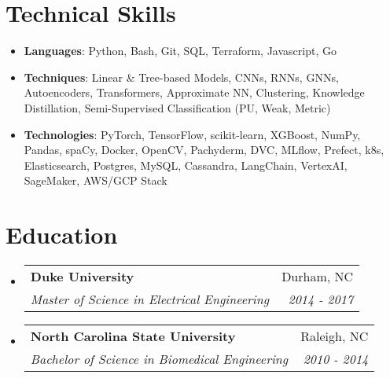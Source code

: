 \documentclass[letterpaper,11pt]{article}
\makeatletter
\newcommand{\skillsItem}[2]{
  \item\small{
    \textbf{#1}{: #2}
  }
}
\newcommand{\resumeSubheading}[4]{
  \vspace{-1pt}\item
    \begin{tabular*}{0.97\textwidth}[t]{l@{\extracolsep{\fill}}r}
      \textbf{#1} & #2 \\
      \textit{\small{#3}} & \textit{\small{#4}} \\
    \end{tabular*}\vspace{-5pt}
}
\newcommand{\resumeSubHeadingListStart}{\begin{itemize}[leftmargin=*]}
\newcommand{\resumeSubHeadingListEnd}{\end{itemize}}
\makeatother
\begin{document}
\section{Technical Skills}
  \resumeSubHeadingListStart
   \skillsItem{Languages}{Python, Bash, Git, SQL, Terraform, Javascript, Go}
  \skillsItem{Techniques}{Linear \& Tree-based Models, CNNs, RNNs, GNNs, Autoencoders, Transformers, Approximate
NN, Clustering, Knowledge Distillation, Semi-Supervised Classification (PU, Weak, Metric)}
   \skillsItem{Technologies}{PyTorch, TensorFlow, scikit-learn, XGBoost, NumPy, Pandas, spaCy, Docker,
OpenCV, Pachyderm, DVC, MLflow, Prefect, k8s, Elasticsearch, Postgres, MySQL, Cassandra, LangChain, VertexAI, SageMaker, AWS/GCP Stack}
  \resumeSubHeadingListEnd





\section{Education}
  \resumeSubHeadingListStart
    \resumeSubheading
      {Duke University}{Durham, NC}
      {Master of Science in Electrical Engineering}{2014 - 2017}
    \resumeSubheading
      {North Carolina State University}{Raleigh, NC}
      {Bachelor of Science in Biomedical Engineering}{2010 - 2014}
  \resumeSubHeadingListEnd
\end{document}
